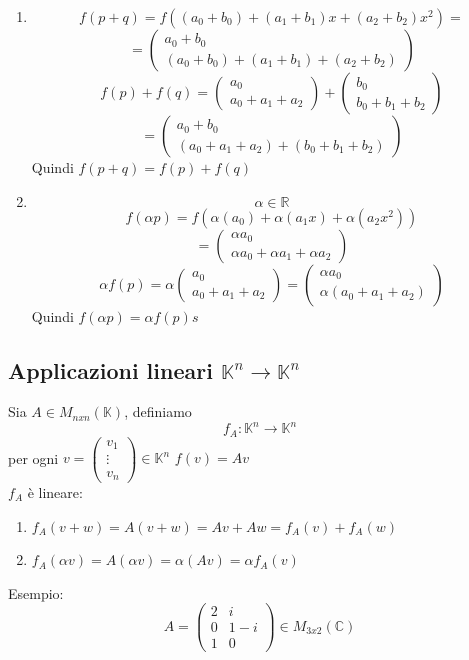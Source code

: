 \documentclass[12pt]{article}
\begin{document}
\begin{enumerate}
    \item
    \[f(p + q) = f((a_0 + b_0)+ (a_1 + b_1)x + (a_2 + b_2)x^2) = \]
    \[= \begin{pmatrix}
        a_0 + b_0\\
        (a_0 + b_0)+ (a_1 + b_1) + (a_2 + b_2)
    \end{pmatrix}\]
    \[f(p) + f(q) = \begin{pmatrix}
        a_0\\
        a_0 + a_1 + a_2
    \end{pmatrix} + \begin{pmatrix}
        b_0\\
        b_0 + b_1 + b_2
    \end{pmatrix}\] \[= \begin{pmatrix}
        a_0 + b_0\\
        (a_0 + a_1 + a_2) + (b_0 + b_1 + b_2)
    \end{pmatrix}\]
Quindi $f(p + q) = f(p) + f(q)$
\item
\[\alpha \in \mathbb{R}\]
\[f(\alpha p) = f(\alpha(a_0) + \alpha(a_1x) + \alpha(a_2x^2))\]
\[= \begin{pmatrix}
    \alpha a_0\\
    \alpha a_0 + \alpha a_1 + \alpha a_2
\end{pmatrix}\]
\[\alpha f(p) = \alpha \begin{pmatrix}
    a_0\\
    a_0 + a_1 + a_2
\end{pmatrix} = \begin{pmatrix}
    \alpha a_0\\
    \alpha (a_0 + a_1 + a_2)
\end{pmatrix}\]
Quindi $f(\alpha p) = \alpha f(p)s$
\end{enumerate}


\subsection{Applicazioni lineari $\mathbb{K}^n \rightarrow \mathbb{K}^n$}
Sia $A \in M_{nxn}(\mathbb{K})$, definiamo \[f_A : \mathbb{K}^n \rightarrow \mathbb{K}^n\]
per ogni $v = \begin{pmatrix}
    v_1\\
    \vdots\\
    v_n
\end{pmatrix} \in \mathbb{K}^n$
$f(v) = Av$\\
$f_A$ è lineare:
\begin{enumerate}
    \item $f_A(v+w) = A(v+w) = Av+Aw = f_A(v) + f_A(w)$
    \item $f_A(\alpha v) = A(\alpha v) = \alpha (Av) = \alpha f_A (v)$
\end{enumerate}
Esempio:
\[A = \begin{pmatrix}
    2 & i\\
    0 & 1-i\\
    1 & 0
\end{pmatrix} \in M_{3x2} (\mathbb{C})\]
\end{document}
